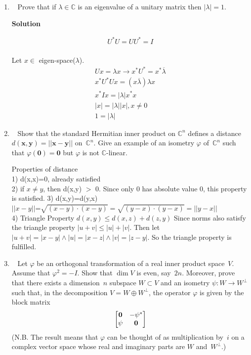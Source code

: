 \documentclass[11pt]{article}
\makeatletter
\newcommand\score[1]{\marginpar{\vspace{-2ex}\color{blue}{#1/3}}\hspace{-1ex}}
\newcommand\0{\mathbf{0}}
\newcommand\CC{\mathbb{C}}
\newcommand\xx{\mathbf{x}}
\newcommand\yy{\mathbf{y}}
\newcommand\<{\langle}
\renewcommand\>{\rangle}
\newcommand\twobytwo[1]{\left[\begin{array}{@{}cc@{}}#1\end{array}\right]}
\makeatother
\begin{document}
\begin{enumerate}
Where $A^{\vert}=A^{-}$, implies that the 2$\times$2 matrix is complex linear(from the $n=1$ case).
We now see that the matrix is commutatitve if and only if every 2$\times$2 is complex linear
which iff the matrix is complex linear.


\item\ \score{3}%
Prove that if $\lambda \in \CC$ is an eigenvalue of a unitary matrix
then $|\lambda| = 1$.

\textbf{Solution}

\begin{align*}
  U^{*}U=UU^{*}=I\\
\end{align*}

Let $x \in $ eigen-space($\lambda$).
\begin{align*}
  Ux=\lambda x \rightarrow x^{*}U^{*}=x^{*} \overline{\lambda}\\
  x^{*} U^{*}Ux=(x \overline{\lambda})\lambda x\\
  x^{*}Ix=\vert\lambda| x^{*}x\\
  |x|= |\lambda||x|, x\neq0\\
  1=|\lambda|
\end{align*}

\item\ \score{3}%
Show that the standard Hermitian inner product on $\CC^n$ defines a
distance $d(\xx,\yy) = ||\xx-\yy||$ on~$\CC^n$.  Give an example of an
isometry $\varphi$ of~$\CC^n$ such that $\varphi(\0) = \0$ but
$\varphi$ is not $\CC$-linear.

Properties of distance\\
1) d(x,x)=0, already satisfied\\
2) if $x\neq y$, then d(x,y) $>$ 0. Since only 0 has absolute
value 0, this property is satisfied.
3) d(x,y)=d(y,x)\\
$||x-y||$=$\sqrt{(x-y) \cdot (x-y)} = \sqrt{(y-x) \cdot (y-x) } = ||y-x||$\\

4) Triangle Property
$d(x,y)\leq d(x,z) + d(z,y)$
Since norms also satisfy the triangle property $|u+v| \leq |u| + |v|$.
Then let $|u+v|=|x-y| \wedge |u|=|x-z| \wedge |v|=|z-y|$. So the triangle property is fulfilled.


\item\ \score{3}%
Let $\varphi$ be an orthogonal transformation of a real inner product
space~$V$.  Assume that $\varphi^2 = -I$.  Show that $\dim V$ is even,
say~$2n$.  Moreover, prove that there exists a dimension~$n$ subspace
$W \subset V$ and an
isometry $\psi: W \to W^\perp$ such that, in the decomposition $V = W
\oplus W^\perp$, the operator $\varphi$ is given by the block matrix
$$%
  \twobytwo{ \0  & -\psi^*
          \\ \psi &    \0 }
$$%
(N.B. The result means that $\varphi$ can be thought of as
multiplication by~$i$ on a complex vector space whose real and
imaginary parts are $W$ and~$W^\perp$.)


\end{enumerate}
\end{document}
